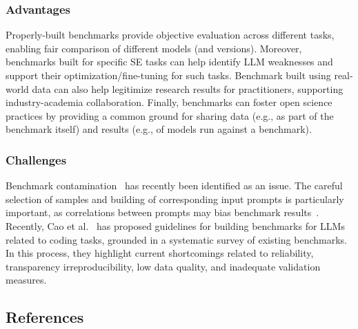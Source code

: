 \documentclass[11pt]{article}
\begin{document}
\subsubsection{Advantages}

Properly-built benchmarks provide objective evaluation across different tasks, enabling fair comparison of different models (and versions).
Moreover, benchmarks built for specific SE tasks can help identify LLM weaknesses and support their optimization/fine-tuning for such tasks.
Benchmark built using real-world data can also help legitimize research results for practitioners, supporting industry-academia collaboration.
Finally, benchmarks can foster open science practices by providing a common ground for sharing data (e.g., as part of the benchmark itself) and results (e.g., of models run against a benchmark).

\subsubsection{Challenges}

Benchmark contamination~\cite{DBLP:journals/corr/abs-2410-16186} has recently been identified as an issue.
The careful selection of samples and building of corresponding input prompts is particularly important, as correlations between prompts may bias benchmark results~\cite{DBLP:conf/acl/SiskaMAB24}.
Recently, Cao et al.~\cite{cao2025should} has proposed guidelines for building benchmarks for LLMs related to coding tasks, grounded in a systematic survey of existing benchmarks. 
In this process, they highlight current shortcomings related to reliability, transparency irreproducibility, low data quality, and inadequate validation measures.


\subsection{References}



\end{document}
